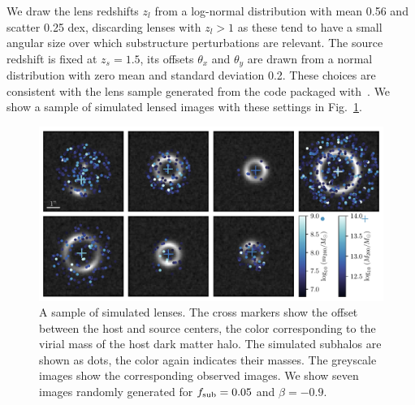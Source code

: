 \documentclass[twocolumn]{aastex62}
\begin{document}
We draw the lens redshifts $z_l$ from a log-normal distribution with mean 0.56 and scatter 0.25 dex, discarding lenses with $z_l > 1$ as these tend to have a small angular size over which substructure perturbations are relevant. The source redshift is fixed at $z_s = 1.5$, its offsets $\theta_x$ and $\theta_y$ are drawn from a normal distribution with zero mean and standard deviation 0.2. These choices are consistent with the lens sample generated from the  code packaged with~\citet{2015ApJ...811...20C}. We show a sample of simulated lensed images with these settings in Fig.~\ref{fig:simulations}.

\begin{figure}
\centering
\includegraphics[width=1.\textwidth]{figures/simulations}
\caption{A sample of simulated lenses. The cross markers show the offset between the host and source centers, the color corresponding to the virial mass of the host dark matter halo. The simulated subhalos are shown as dots, the color again indicates their masses. The greyscale images show the corresponding observed images. We show seven images randomly generated for $f_{\mathrm{sub}} = 0.05$ and $\beta = -0.9$.}
\label{fig:simulations}
\end{figure}
\end{document}
